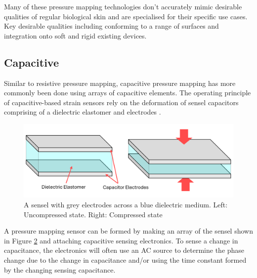 \begin{figure}[H]
	\label{fig:mechano-tech}
\end{figure}
Many of these pressure mapping technologies don't accurately mimic desirable qualities of regular biological skin and are specialised for their specific use cases. Key desirable qualities including conforming to a range of surfaces and integration onto soft and rigid existing devices.


\subsection{Capacitive}
Similar to resistive pressure mapping, capacitive pressure mapping has more commonly been done using arrays of capacitive elements. The operating principle of capacitive-based strain sensors rely on the deformation of sensel capacitors comprising of a dielectric elastomer and electrodes \cite{Sapra2023,Zhu2021,Liang2015}.
\begin{figure}[H]
	\centering
	\includegraphics[width=0.6\linewidth]{Figures/cap_deformed_states_x2_crop_label.png}
	\caption{A sensel with grey electrodes across a blue dielectric medium. Left: Uncompressed state. Right: Compressed state}
	\label{fig:cap_deformed_cube}
\end{figure}
A pressure mapping sensor can be formed by making an array of the sensel shown in Figure \ref{fig:cap_deformed_cube} and attaching capacitive sensing electronics. To sense a change in capacitance, the electronics will often use an AC source to determine the phase change due to the change in capacitance and/or using the time constant formed by the changing sensing capacitance.


